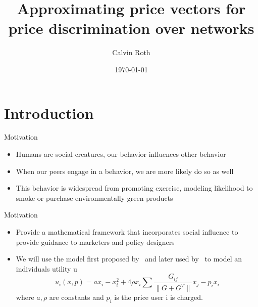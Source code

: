 \documentclass[a4paper,12pt]{beamer}
\title{Approximating price vectors for price discrimination over networks}
\date{\today}
\author{Calvin Roth}
\begin{document}
\maketitle

\tableofcontents
\section{Introduction}
\begin{frame}{Motivation}
  \begin{itemize}
    \item Humans are social creatures, our behavior influences other behavior
    \item When our peers engage in a behavior, we are more likely do so as well
    \item This behavior is widespread from promoting exercise\cite{SocialInfluenceandExerciseAMetaAnalysis}, modeling likelihood to smoke\cite{urberg1997close} or purchase environmentally green products\cite{dagher2012influence}
  \end{itemize}
\end{frame}

\begin{frame}{Motivation}
  \begin{itemize}
    \item Provide a mathematical framework that incorporates social influence to provide guidance to marketers and policy designers \\
 \item We will use the model first proposed by~\cite{candogan2012optimal} and later used by~\cite{huang2021value} to model an individuals utility u
          \begin{equation}
            u_{i}(x, p) = ax_{i} - x_{i}^{2} + 4 \rho x_{i} \sum \frac{G_{ij}}{\|G+G^{T}\|} x_{j} - p_{i}x_{i}
          \end{equation}
          where $a,\rho$ are constants and $p_{i}$ is the price user i is charged.
\end{itemize}
\end{frame}
\end{document}
